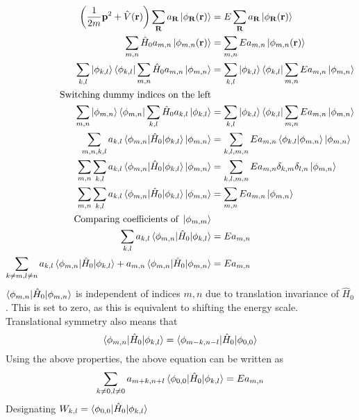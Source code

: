 \begin{align}
 \left(\frac{1}{2m}\mathbf{p}^2 + \hat{V}(\mathbf{r})\right)\sum_{\mathbf{R}}{a_{\mathbf{R}} \ket{\phi_{\mathbf{R}}(\mathbf{r})}} &= E\sum_{\mathbf{R}}{a_{\mathbf{R}} \ket{\phi_{\mathbf{R}}(\mathbf{r})}} \nonumber\\
 \sum_{m, n}{\hat{H}_{0}a_{m,n}\ket{\phi_{m,n}(\mathbf{r})}} &= \sum_{m, n}{E a_{m,n}\ket{\phi_{m,n}(\mathbf{r})}} \nonumber\\
 \sum_{k, l}{\ket{\phi_{k,l}}\bra{\phi_{k,l}}}\sum_{m, n}{\hat{H}_{0}a_{m,n}\ket{\phi_{m,n}}} &= \sum_{k, l}{\ket{\phi_{k,l}}\bra{\phi_{k,l}}}\sum_{m, n}{E a_{m,n}\ket{\phi_{m,n}}} \nonumber\\
 \text{Switching dummy indices on the left}\nonumber\\
 \sum_{m, n}{\ket{\phi_{m,n}}\bra{\phi_{m,n}}}\sum_{k, l}{\hat{H}_{0}a_{k,l}\ket{\phi_{k,l}}} &= \sum_{k, l}{\ket{\phi_{k,l}}\bra{\phi_{k,l}}}\sum_{m, n}{E a_{m,n}\ket{\phi_{m,n}}} \nonumber \\
 \sum_{m, n, k, l}{a_{k,l}\braket{\phi_{m,n}|\hat{H}_{0}|\phi_{k,l}}\ket{\phi_{m,n}}} &= \sum_{k, l, m, n}{E a_{m,n} \braket{\phi_{k,l}|\phi_{m,n}}\ket{\phi_{m,n}}}\nonumber\\
 \sum_{m, n}\sum_{k, l}{a_{k,l}\braket{\phi_{m,n}|\hat{H}_{0}|\phi_{k,l}}\ket{\phi_{m,n}}} &= \sum_{k, l, m, n}{E a_{m,n} \delta_{k, m} \delta_{l, n} \ket{\phi_{m,n}}}\nonumber\\
 \sum_{m, n}\sum_{k, l}{a_{k,l}\braket{\phi_{m,n}|\hat{H}_{0}|\phi_{k,l}}\ket{\phi_{m,n}}} &= \sum_{m, n}{E a_{m,n} \ket{\phi_{m,n}}}\nonumber\\
 \text{Comparing coefficients of }\ket{\phi_{m,m}} \nonumber \\ 
 \sum_{k, l}{a_{k,l}\braket{\phi_{m,n}|\hat{H}_{0}|\phi_{k,l}}} &= E a_{m,n} \nonumber \\
 \sum_{k\neq m, l\neq n}{a_{k,l}\braket{\phi_{m,n}|\hat{H}_{0}|\phi_{k,l}}} + a_{m,n}\braket{\phi_{m,n}|\hat{H}_{0}|\phi_{m,n}} &= E a_{m,n}
\end{align}
$\braket{\phi_{m,n}|\hat{H}_{0}|\phi_{m,n}}$ is independent of indices $m, n$ due to translation invariance of $\hat{H}_{0}$. This is set to zero, as this is equivalent to shifting
the energy scale. Translational symmetry also means that 
\begin{equation*}
 \braket{\phi_{m,n}|\hat{H}_{0}|\phi_{k,l}} = \braket{\phi_{m-k,n-l}|\hat{H}_{0}|\phi_{0, 0}}
\end{equation*} Using the above properties, the above equation can be written as
\begin{equation*}
 \sum_{k\neq 0, l\neq 0}{a_{m+k,n+l}\braket{\phi_{0,0}|\hat{H}_{0}|\phi_{k,l}}} = E a_{m,n}
\end{equation*} Designating $W_{k, l} = \braket{\phi_{0,0}|\hat{H}_{0}|\phi_{k,l}}$
